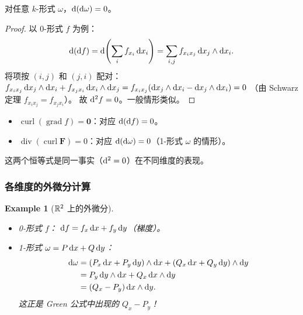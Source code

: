 \documentclass{article}
\newtheorem{example}[theorem]{Example}
\DeclareMathOperator{\curl}{curl}
\DeclareMathOperator{\divergence}{div}
\DeclareMathOperator{\grad}{grad}
\begin{document}
\begin{theorem}[$\dif^2 = 0$]
  对任意 $k$-形式 $\omega$，$\mathrm{d}(\mathrm{d}\omega) = 0$。
\end{theorem}

\begin{proof}
  以 0-形式 $f$ 为例：
  \[
    \mathrm{d}(\mathrm{d} f)
    = \mathrm{d}\!\left(\sum_i f_{x_i}\,\mathrm{d} x_i\right)
    = \sum_{i,j} f_{x_i x_j}\,\mathrm{d} x_j \wedge \mathrm{d} x_i.
  \]
  将项按 $(i,j)$ 和 $(j,i)$ 配对：
  $f_{x_i x_j}\,\mathrm{d} x_j \wedge \mathrm{d} x_i + f_{x_j x_i}\,\mathrm{d} x_i \wedge \mathrm{d} x_j
  = f_{x_i x_j}(\mathrm{d} x_j \wedge \mathrm{d} x_i - \mathrm{d} x_j \wedge \mathrm{d} x_i) = 0$
  （由 Schwarz 定理 $f_{x_i x_j} = f_{x_j x_i}$）。
  故 $\mathrm{d}^2 f = 0$。一般情形类似。
\end{proof}

\begin{remark}[$\dif^2 = 0$ 的向量场解释]
  \begin{itemize}
    \item $\curl(\grad f) = \mathbf{0}$：对应 $\mathrm{d}(\mathrm{d} f) = 0$。
    \item $\divergence(\curl\mathbf{F}) = 0$：对应 $\mathrm{d}(\mathrm{d}\omega) =
      0$（1-形式 $\omega$ 的情形）。
  \end{itemize}
  这两个恒等式是同一事实（$\dif^2=0$）在不同维度的表现。
\end{remark}

\subsubsection*{各维度的外微分计算}

\begin{example}[$\mathbb{R}^2$ 上的外微分]
  \begin{itemize}
    \item 0-形式 $f$：
      $\mathrm{d} f = f_x\,\mathrm{d} x + f_y\,\mathrm{d} y$（梯度）。
    \item 1-形式 $\omega = P\,\mathrm{d} x + Q\,\mathrm{d} y$：
      \begin{align*}
        \mathrm{d}\omega &= (P_x\,\mathrm{d} x + P_y\,\mathrm{d} y) \wedge \mathrm{d} x
        + (Q_x\,\mathrm{d} x + Q_y\,\mathrm{d} y) \wedge \mathrm{d} y \\
        &= P_y\,\mathrm{d} y \wedge \mathrm{d} x + Q_x\,\mathrm{d} x \wedge \mathrm{d} y \\
        &= (Q_x - P_y)\,\mathrm{d} x \wedge \mathrm{d} y.
      \end{align*}
      这正是 Green 公式中出现的 $Q_x - P_y$！
  \end{itemize}
\end{example}
\end{document}
